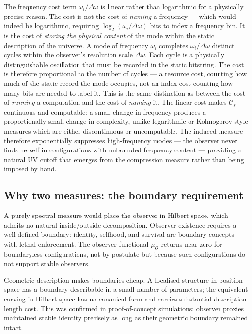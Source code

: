 \documentclass[12pt,a4paper]{article}
\newcommand{\muO}{\mu_O}
\begin{document}
The frequency cost term $\omega_i / \Delta\omega$ is linear rather than logarithmic for a physically precise reason. The cost is not the cost of \emph{naming} a frequency --- which would indeed be logarithmic, requiring $\log_2(\omega_i / \Delta\omega)$ bits to index a frequency bin. It is the cost of \emph{storing the physical content} of the mode within the static description of the universe. A mode of frequency $\omega_i$ completes $\omega_i / \Delta\omega$ distinct cycles within the observer's resolution scale $\Delta\omega$. Each cycle is a physically distinguishable oscillation that must be recorded in the static bitstring. The cost is therefore proportional to the number of cycles --- a resource cost, counting how much of the static record the mode occupies, not an index cost counting how many bits are needed to label it. This is the same distinction as between the cost of \emph{running} a computation and the cost of \emph{naming} it. The linear cost makes $\mathcal{C}_s$ continuous and computable: a small change in frequency produces a proportionally small change in complexity, unlike logarithmic or Kolmogorov-style measures which are either discontinuous or uncomputable. The induced measure therefore exponentially suppresses high-frequency modes --- the observer never finds herself in configurations with unbounded frequency content --- providing a natural UV cutoff that emerges from the compression measure rather than being imposed by hand.


\subsection*{Why two measures: the boundary requirement}

A purely spectral measure would place the observer in Hilbert space, which admits no natural inside/outside decomposition. Observer existence requires a well-defined boundary: identity, selfhood, and survival are boundary concepts with lethal enforcement. The observer functional $\muO$ returns near zero for boundaryless configurations, not by postulate but because such configurations do not support stable observers.

Geometric description makes boundaries cheap. A localised structure in position space has a boundary describable in a small number of parameters; the equivalent carving in Hilbert space has no canonical form and carries substantial description length cost. This was confirmed in proof-of-concept simulations: observer proxies maintained stable identity precisely as long as their geometric boundary remained intact.
\end{document}
